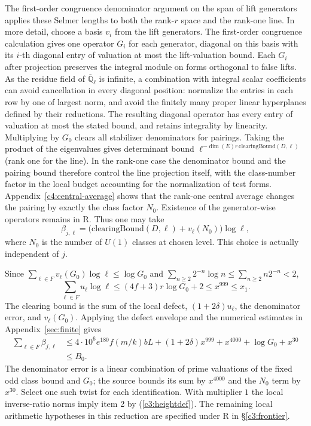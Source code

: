 The first-order congruence denominator argument on the span of
lift generators applies these Selmer lengths to both the rank-$r$
space and the rank-one line. In more detail, choose a basis $v_i$ from the lift generators.
The first-order congruence calculation gives one operator $G_i$ for
each generator, diagonal on this basis with its $i$-th diagonal
entry of valuation at most the lift-valuation bound. Each $G_i$
after projection preserves the integral module on forms orthogonal
to false lifts. As the residue field of $\overline{\mathbb Q}_\ell$
is infinite, a combination with integral scalar coefficients
can avoid cancellation in every diagonal position: normalize the
entries in each row by one of largest norm, and avoid the finitely
many proper linear hyperplanes defined by their reductions. The
resulting diagonal operator has every entry of valuation at most
the stated bound, and retains integrality by linearity. Multiplying
by $G_0$ clears all stabilizer denominators for pairings. Taking
the product of the eigenvalues gives determinant bound
$\ell^{-\dim(E)r\,\mathrm{clearingBound}(D,\ell)}$ (rank one for
the line). In the rank-one case the denominator bound and the
pairing bound therefore control the line projection itself, with
the class-number factor in the local budget accounting for the
normalization of test forms. Appendix~\ref{c4:central-average} shows that the rank-one
central average changes the pairing by exactly the class factor
$N_0$. Existence of the generator-wise operators remains in R.
Thus one may take
\[
 \beta_{j,\ell}=\bigl(\mathrm{clearingBound}(D,\ell)
                     +v_\ell(N_0)\bigr)\log\ell ,
\]
where $N_0$ is the number of $U(1)$ classes at chosen level. This
choice is actually independent of $j$.

Since $\sum_{\ell\in F}v_\ell(G_0)\log\ell
\le\log G_0$ and
$\sum_{n\ge2}2^{-n}\log n\le\sum_{n\ge2}n2^{-n}<2$,
\[
 \sum_{\ell\in F}u_\ell\log\ell
 \le (4f+3)r\log G_0+2\le x^{999}\le x_1 .
\]
The clearing bound is the sum of the local defect, $(1+2\delta)u_\ell$,
the denominator error, and $v_\ell(G_0)$. Applying the defect envelope and the numerical estimates
in Appendix~\ref{sec:finite} gives
\begin{align*}
 \sum_{\ell\in F}\beta_{j,\ell}
 &\le 4\cdot10^6e^{180} f(m/k)bL
 +(1+2\delta)x^{999}+x^{4000}+\log G_0+x^{30}\\
 &\le B_0.
\end{align*}
The denominator error is a linear combination of prime valuations of
the fixed odd class bound and $G_0$; the source bounds its sum by
$x^{4000}$ and the $N_0$ term by $x^{30}$. Select one such twist for
each identification. With multiplier $1$ the local inverse-ratio
norms imply item 2 by (\ref{c3:heightdef}). The remaining local arithmetic hypotheses in this reduction are
specified under R in \S\ref{c3:frontier}.

